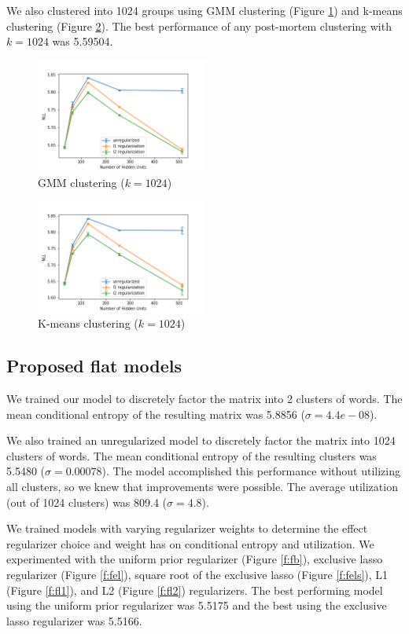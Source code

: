 \documentclass[11pt,letterpaper]{article}
\begin{document}
We also clustered into 1024 groups using GMM clustering (Figure \ref{f:fgmm}) and k-means clustering (Figure \ref{f:fkm}). The best performance of any post-mortem clustering with $k=1024$ was 5.59504.

\begin{figure}
  \caption{GMM clustering ($k=1024$)}
\label{f:fgmm}
  \centering
    \includegraphics[width=0.5\textwidth]{flat_gmm.png}
\end{figure}


\begin{figure}
  \caption{K-means clustering ($k=1024$)}
\label{f:fkm}
  \centering
    \includegraphics[width=0.5\textwidth]{flat_km.png}
\end{figure}

\subsection{Proposed flat models}

We trained our model to discretely factor the matrix into 2 clusters of words. The mean conditional entropy of the resulting matrix was 5.8856 ($\sigma=4.4e-08$).

We also trained an unregularized model to discretely factor the matrix into 1024 clusters of words. The mean conditional entropy of the resulting clusters was 5.5480 ($\sigma=0.00078$). The model accomplished this performance without utilizing all clusters, so we knew that improvements were possible. The average utilization (out of 1024 clusters) was 809.4 ($\sigma=4.8$).

We trained models with varying regularizer weights to determine the effect regularizer choice and weight has on conditional entropy and utilization. We experimented with the uniform prior regularizer (Figure \ref{f:fb}), exclusive lasso regularizer (Figure \ref{f:fel}), square root of the exclusive lasso (Figure \ref{f:fels}), L1 (Figure \ref{f:fl1}), and L2 (Figure \ref{f:fl2}) regularizers. The best performing model using the uniform prior regularizer was 5.5175 and the best using the exclusive lasso regularizer was 5.5166.
\end{document}
